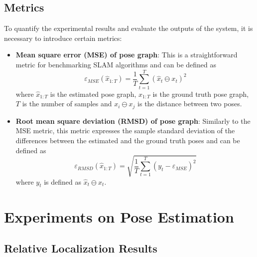 
\subsection{Metrics} \label{metrics}

To quantify the experimental results and evaluate the outputs of the system,
it is necessary to introduce certain metrics:
\begin{itemize}
    \item \textbf{Mean square error (MSE) of pose graph}:
        This is a straightforward metric for benchmarking SLAM algorithms
        and can be defined as
        \begin{equation}
            \varepsilon_{MSE} (\hat{x}_{1:T}) = \frac{1}{T}
            \sum\limits_{t=1}^T (\hat{x}_t \ominus x_t)^2
        \end{equation}
        where
        $\hat{x}_{1:T}$ is the estimated pose graph,
        $x_{1:T}$ is the ground truth pose graph,
        $T$ is the number of samples and
        $x_i \ominus x_j$ is the distance between two poses.


    \item \textbf{Root mean square deviation (RMSD) of pose graph}:
        Similarly to the MSE metric, this metric expresses the sample
        standard deviation of the differences between the estimated and the
        ground truth poses and can be defined as
        \begin{equation}
            \varepsilon_{RMSD} (\hat{x}_{1:T}) = \sqrt{\frac{1}{T}
            \sum\limits_{t=1}^T (y_t - \varepsilon_{MSE})^2}
        \end{equation}
        where $y_t$ is defined as $\hat{x}_t \ominus x_t$.

\end{itemize}

\section{Experiments on Pose Estimation}

\subsection{Relative Localization Results}

